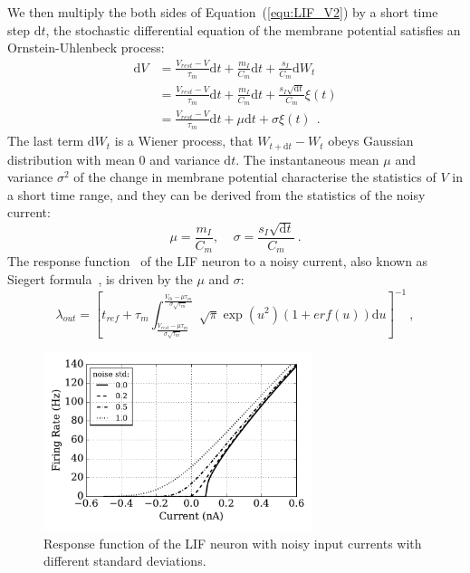 \documentclass[runningheads,a4paper]{llncs}
\def\D{\mathrm{d}}
\begin{document}
We then multiply the both sides of Equation~(\ref{equ:LIF_V2}) by a short time step $\D t$, the stochastic differential equation of the membrane potential satisfies an Ornstein-Uhlenbeck process:
\begin{equation}
\begin{aligned}
\D V&= \frac{V_{rest} - V}{\tau_m }\D t + \frac{m_I}{C_m} \D t + \frac{s_I}{C_m}  \D W_t \\
&=\frac{V_{rest} - V}{\tau_m }\D t + \frac{m_I}{C_m} \D t + \frac{s_I \sqrt{\D t}}{C_m} \xi(t)  \\
&=\frac{V_{rest} - V}{\tau_m }\D t + \mu \D t + \sigma \xi(t) ~~. 
\end{aligned}
\end{equation}	
The last term $\D W_t$ is a Wiener process, that $W_{t +\D t} - W_{t}$ obeys Gaussian distribution with mean 0 and variance $\D t$.
The instantaneous mean $\mu$ and variance $\sigma^2$ of the change in membrane potential characterise the statistics of $V$ in a short time range, and they can be derived from the statistics of the noisy current:
\begin{equation}
\mu =\dfrac{m_I}{C_m}, ~~~~~ \sigma = \dfrac{s_I \sqrt{\D t}}{C_m}~.
\end{equation}
The response function~\cite{rauch2003neocortical,la2008response} of the LIF neuron to a noisy current, also known as Siegert formula~\cite{siegert1951first}, is driven by the $\mu$ and $\sigma$:
\begin{equation}
\lambda_\mathit{out}=
\left [ t_\mathit{ref}+\tau_m \int_{\frac{V_\mathit{rest}-\mu \tau_m }{\sigma \sqrt{\tau_m}}}^{\frac{V_{th}-\mu \tau_m }{\sigma \sqrt{\tau_m}}} \sqrt{\pi} \exp(u^{2}) (1+erf(u)) \D u \right ]^{-1} ~,
\label{equ:siegert}
\end{equation}



\begin{figure}[bt]
	\centering
	\includegraphics[width=0.7\textwidth]{1.pdf}
	\caption{Response function of the LIF neuron with noisy input currents with different standard deviations.}
	\label{Fig:physics}
\end{figure}
\end{document}
